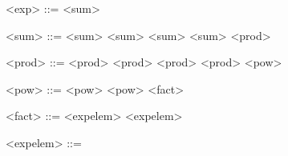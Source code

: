 \begin{grammarEx}
	<exp> ::= <sum>
	
	<sum> ::= <sum> \lit{\opplus{}} <sum>
	\alt <sum> \lit{\opminus{}} <sum>
	\alt <prod>

	<prod> ::= <prod> \lit{\opmult{}} <prod>
	\alt <prod> \lit{\opdiv{}} <prod>
	\alt <pow>

	<pow> ::= <pow> \lit{\oppow{}} <pow>
	\alt <fact>

	<fact> ::= <exp\textunderscore elem> \lit{!}
	\alt <exp\textunderscore elem>

	<exp\textunderscore elem> ::= 
	\alt {}
\end{grammarEx}